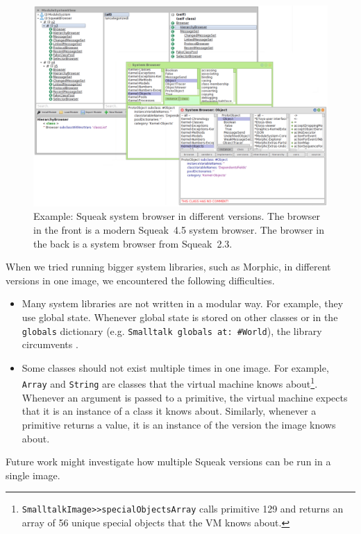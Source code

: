 \begin{figure}[!htp]
\includegraphics[width=\textwidth]{usecase_browsers.png}
\centering
\caption[Example: Squeak system browser in different versions]{Example: Squeak system browser in different versions. The browser in the front is a modern Squeak~4.5 system browser. The browser in the back is a system browser from Squeak~2.3.}
\label{fig:usecase_browsers}
\end{figure}

When we tried running bigger system libraries, such as Morphic, in different versions in one image, we encountered the following difficulties.
\begin{itemize}
    \item Many system libraries are not written in a modular way. For example, they use global state. Whenever global state is stored on other classes or in the \texttt{globals} dictionary (e.g. \texttt{Smalltalk globals at: \#World}), the library circumvents \msname.
    \item Some classes should not exist multiple times in one image. For example, \texttt{Array} and \texttt{String} are classes that the virtual machine knows about\footnote{\texttt{SmalltalkImage>>specialObjectsArray} calls primitive 129 and returns an array of 56 unique special objects that the VM knows about.}. Whenever an argument is passed to a primitive, the virtual machine expects that it is an instance of a class it knows about. Similarly, whenever a primitive returns a value, it is an instance of the version the image knows about.
\end{itemize}

Future work might investigate how multiple Squeak versions can be run in a single image.

